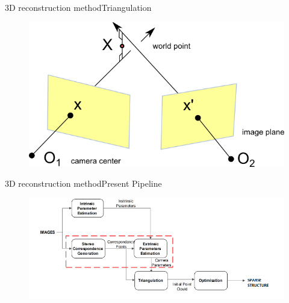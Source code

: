\documentclass{beamer}
\begin{document}
\begin{frame}{3D reconstruction method}{Triangulation}
  \begin{figure}[ht!]
    \centering
    \includegraphics[width=0.6\linewidth]{triangulation.png}
  \note{\textcolor{green}{Soccer\\}}

  \end{figure}
\end{frame}

\begin{frame}{3D reconstruction method}{Present Pipeline}
  \begin{figure}[ht!]
    \centering
    \includegraphics[width=\linewidth]{traditional_paipeline.png}
  \end{figure}
  \note{\textcolor{red}{Kartikeya\\}}
\end{frame}
\end{document}
